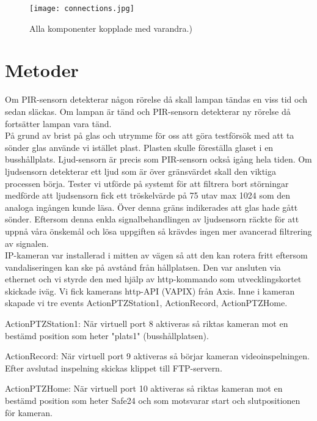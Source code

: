 \begin{figure}[h]

  \texttt{[image: connections.jpg]}
  \caption{Alla komponenter kopplade med varandra.)}
  \label{fig:connections}
\end{figure}
\clearpage



\section{Metoder} 
Om PIR-sensorn detekterar någon rörelse då skall lampan tändas en viss tid och sedan släckas. Om lampan är tänd och PIR-sensorn detekterar ny rörelse då fortsätter lampan vara tänd.\\

På grund av brist på glas och utrymme för oss att göra testförsök med att ta sönder glas använde vi istället plast. Plasten skulle föreställa glaset i en busshållplats. Ljud-sensorn är precis som PIR-sensorn också igång hela tiden. Om ljudsensorn detekterar ett ljud som är över gränsvärdet skall den viktiga processen börja. Tester vi utförde på systemt för att filtrera bort störningar medförde att ljudsensorn fick ett tröskelvärde på 75 utav max 1024 som den analoga ingången kunde läsa. Över denna gräns indikerades att glas hade gått sönder. Eftersom denna enkla signalbehandlingen av ljudsensorn räckte för att uppnå våra önskemål och lösa uppgiften så krävdes ingen mer avancerad filtrering av signalen.\\

IP-kameran var installerad i mitten av vägen så att den kan rotera fritt eftersom vandaliseringen kan ske på avstånd från hållplatsen. Den var ansluten via ethernet och vi styrde den med hjälp av http-kommando som utvecklingskortet skickade iväg. Vi fick kamerans http-API (VAPIX) från Axis. Inne i kameran skapade vi tre events ActionPTZStation1, ActionRecord, ActionPTZHome.

ActionPTZStation1: När virtuell port 8 aktiveras så riktas kameran mot en bestämd position som  heter "plats1" (busshållplatsen).

ActionRecord: När virtuell port 9 aktiveras så börjar kameran videoinspelningen. Efter avslutad inspelning skickas klippet till FTP-servern.

ActionPTZHome: När virtuell port 10 aktiveras så riktas kameran mot en bestämd position som heter Safe24 och som motsvarar start och slutpositionen för kameran.\\


